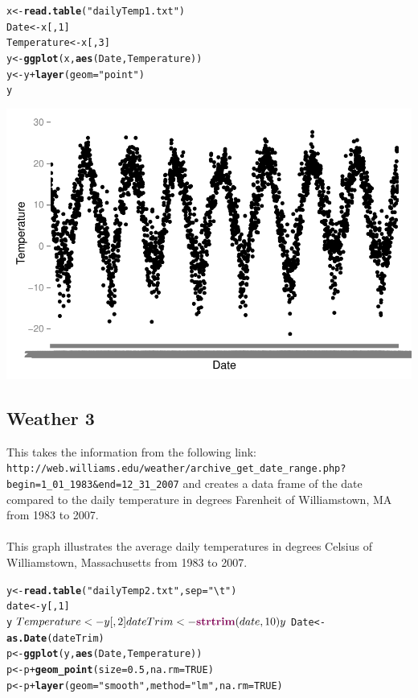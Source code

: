 \documentclass{article}\usepackage{graphicx, color}
\makeatletter
\def\maxwidth{ %
  \ifdim\Gin@nat@width>\linewidth
    \linewidth
  \else
    \Gin@nat@width
  \fi
}
\newcommand{\hlfunctioncall}[1]{\textcolor[rgb]{0.501960784313725,0,0.329411764705882}{\textbf{#1}}}%
\newcommand{\hlstring}[1]{\textcolor[rgb]{0.6,0.6,1}{#1}}%
\newenvironment{kframe}{%
 \def\at@end@of@kframe{}%
 \ifinner\ifhmode%
  \def\at@end@of@kframe{\end{minipage}}%
  \begin{minipage}{\columnwidth}%
 \fi\fi%
 \def\FrameCommand##1{\hskip\@totalleftmargin \hskip-\fboxsep
 \colorbox{shadecolor}{##1}\hskip-\fboxsep
     \hskip-\linewidth \hskip-\@totalleftmargin \hskip\columnwidth}%
 \MakeFramed {\advance\hsize-\width
   \@totalleftmargin\z@ \linewidth\hsize
   \@setminipage}}%
 {\par\unskip\endMakeFramed%
 \at@end@of@kframe}
\newenvironment{knitrout}{}{} %
\makeatother
\begin{document}
\begin{knitrout}
\color{fgcolor}\begin{kframe}
\begin{alltt}
x <- \hlfunctioncall{read.table}(\hlstring{"dailyTemp1.txt"})
Date <- x[, 1]
Temperature <- x[, 3]
y <- \hlfunctioncall{ggplot}(x, \hlfunctioncall{aes}(Date, Temperature))
y <- y + \hlfunctioncall{layer}(geom = \hlstring{"point"})
y
\end{alltt}
\end{kframe}
\includegraphics[width=\maxwidth]{figure/graph2} 

\end{knitrout}


\subsection*{Weather 3}
This takes the information from the following link:
 \verb+http://web.williams.edu/weather/archive_get_date_range.php?begin=1_01_1983&end=12_31_2007+
and creates a data frame of the date compared to the daily temperature
in degrees Farenheit of Williamstown, MA from 1983 to 2007.
\\
\\
This graph illustrates the average daily temperatures in degrees Celsius of
Williamstown, Massachusetts from 1983 to 2007.

\begin{knitrout}
\color{fgcolor}\begin{kframe}
\begin{alltt}
y <- \hlfunctioncall{read.table}(\hlstring{"dailyTemp2.txt"}, sep = \hlstring{"\textbackslash{}t"})
date <- y[, 1]
y$Temperature <- y[, 2]
dateTrim <- \hlfunctioncall{strtrim}(date, 10)
y$Date <- \hlfunctioncall{as.Date}(dateTrim)
p <- \hlfunctioncall{ggplot}(y, \hlfunctioncall{aes}(Date, Temperature))
p <- p + \hlfunctioncall{geom_point}(size = 0.5, na.rm = TRUE)
p <- p + \hlfunctioncall{layer}(geom = \hlstring{"smooth"}, method = \hlstring{"lm"}, na.rm = TRUE)
\end{alltt}
\end{kframe}
\end{knitrout}
\end{document}
